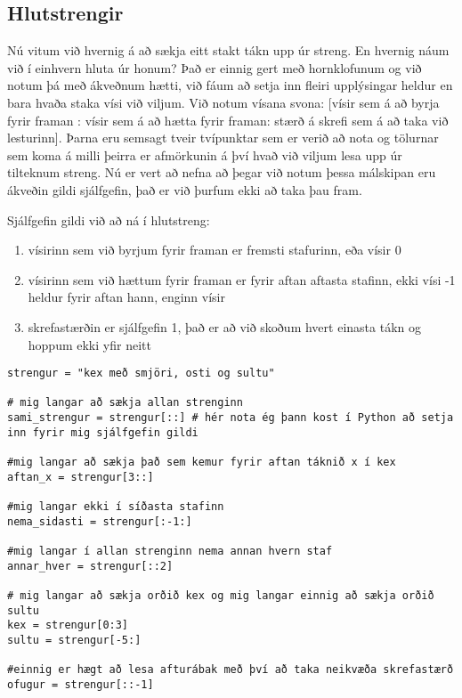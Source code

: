 \subsection{Hlutstrengir}
Nú vitum við hvernig á að sækja eitt stakt tákn upp úr streng.
En hvernig náum við í einhvern hluta úr honum?
Það er einnig gert með hornklofunum og við notum þá með ákveðnum hætti, við fáum að setja inn fleiri upplýsingar heldur en bara hvaða staka vísi við viljum.
Við notum vísana svona: [vísir sem á að byrja fyrir framan : vísir sem á að hætta fyrir framan: stærð á skrefi sem á að taka við lesturinn].
Þarna eru semsagt tveir tvípunktar sem er verið að nota og tölurnar sem koma á milli þeirra er afmörkunin á því hvað við viljum lesa upp úr tilteknum streng.
Nú er vert að nefna að þegar við notum þessa málskipan eru ákveðin gildi sjálfgefin, það er við þurfum ekki að taka þau fram.

Sjálfgefin gildi við að ná í hlutstreng:
\begin{enumerate}
	\item vísirinn sem við byrjum fyrir framan er fremsti stafurinn, eða vísir 0
	\item vísirinn sem við hættum fyrir framan er fyrir aftan aftasta stafinn, ekki vísi -1 heldur fyrir aftan hann, enginn vísir
	\item skrefastærðin er sjálfgefin 1, það er að við skoðum hvert einasta tákn og hoppum ekki yfir neitt
\end{enumerate}

\begin{lstlisting}[caption=Hlutstrengir, label=lst:hlutstrengir]
strengur = "kex með smjöri, osti og sultu"

# mig langar að sækja allan strenginn
sami_strengur = strengur[::] # hér nota ég þann kost í Python að setja inn fyrir mig sjálfgefin gildi

#mig langar að sækja það sem kemur fyrir aftan táknið x í kex
aftan_x = strengur[3::]

#mig langar ekki í síðasta stafinn
nema_sidasti = strengur[:-1:]

#mig langar í allan strenginn nema annan hvern staf
annar_hver = strengur[::2]

# mig langar að sækja orðið kex og mig langar einnig að sækja orðið sultu
kex = strengur[0:3]
sultu = strengur[-5:]

#einnig er hægt að lesa afturábak með því að taka neikvæða skrefastærð
ofugur = strengur[::-1]
\end{lstlisting}


